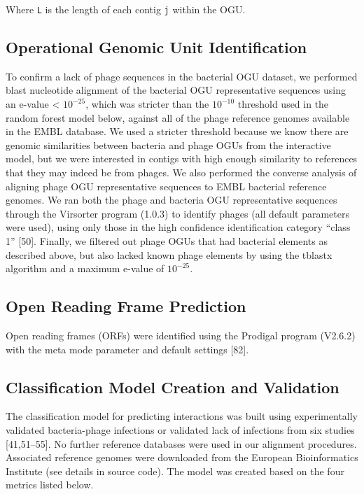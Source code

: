 \documentclass[12pt,]{article}
\begin{document}
Where \texttt{L} is the length of each contig \texttt{j} within the OGU.

\subsection{Operational Genomic Unit
Identification}\label{operational-genomic-unit-identification}

To confirm a lack of phage sequences in the bacterial OGU dataset, we
performed blast nucleotide alignment of the bacterial OGU representative
sequences using an e-value \textless{} \(10^{-25}\), which was stricter
than the \(10^{-10}\) threshold used in the random forest model below,
against all of the phage reference genomes available in the EMBL
database. We used a stricter threshold because we know there are genomic
similarities between bacteria and phage OGUs from the interactive model,
but we were interested in contigs with high enough similarity to
references that they may indeed be from phages. We also performed the
converse analysis of aligning phage OGU representative sequences to EMBL
bacterial reference genomes. We ran both the phage and bacteria OGU
representative sequences through the Virsorter program (1.0.3) to
identify phages (all default parameters were used), using only those in
the high confidence identification category ``class 1'' {[}50{]}.
Finally, we filtered out phage OGUs that had bacterial elements as
described above, but also lacked known phage elements by using the
tblastx algorithm and a maximum e-value of \(10^{-25}\).

\subsection{Open Reading Frame
Prediction}\label{open-reading-frame-prediction}

Open reading frames (ORFs) were identified using the Prodigal program
(V2.6.2) with the meta mode parameter and default settings {[}82{]}.

\subsection{Classification Model Creation and
Validation}\label{classification-model-creation-and-validation}

The classification model for predicting interactions was built using
experimentally validated bacteria-phage infections or validated lack of
infections from six studies {[}41,51--55{]}. No further reference
databases were used in our alignment procedures. Associated reference
genomes were downloaded from the European Bioinformatics Institute (see
details in source code). The model was created based on the four metrics
listed below.
\end{document}
